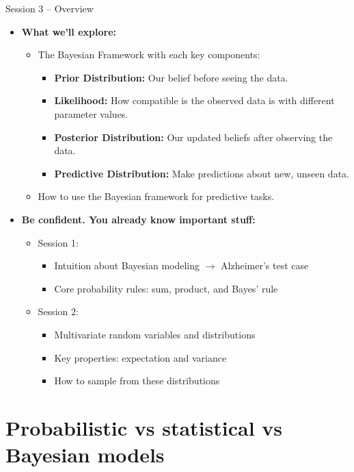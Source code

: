 \documentclass{beamer}
\begin{document}
\begin{frame}{Session 3 – Overview}
  \begin{itemize}
    \item \textbf{What we’ll explore:}
    \begin{itemize}
      \item The Bayesian Framework with each key components:
      \begin{itemize}
        \item \textbf{Prior Distribution:} Our belief before seeing the data.
        \item \textbf{Likelihood:} How compatible is the observed data is with different parameter values.
        \item \textbf{Posterior Distribution:} Our updated beliefs after observing the data.
        \item \textbf{Predictive Distribution:} Make predictions about new, unseen data.
      \end{itemize}
      \item How to use the Bayesian framework for predictive tasks.
    \end{itemize}
    \vspace{0.5cm}
    \item \textbf{Be confident. You already know important stuff:}
      \begin{itemize}
        \item Session 1:
          \begin{itemize}
            \item Intuition about Bayesian modeling $\rightarrow$ Alzheimer’s test case
            \item Core probability rules: sum, product, and Bayes' rule
            \end{itemize}
          \item Session 2:
            \begin{itemize}
              \item Multivariate random variables and distributions
              \item Key properties: expectation and variance
              \item How to sample from these distributions
            \end{itemize}
    \end{itemize}
  \end{itemize}
\end{frame}

\section{Probabilistic vs statistical vs Bayesian models}
\end{document}
